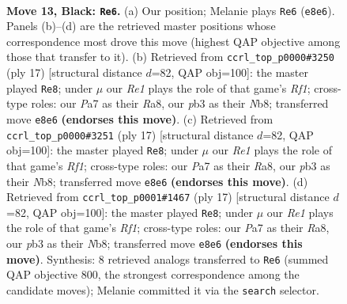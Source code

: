 \documentclass[11pt]{article}
\begin{document}
\clearpage

\begin{figure}[p]\centering
\begin{subfigure}{0.46\textwidth}\centering
\resizebox{\linewidth}{!}{%
\newchessgame
\chessboard[
  setfen={rnbqrk2/p4pp1/1p3n2/3p3p/Pb1P3P/1PNB1NP1/3K1P2/R1BQ3R b - - 0 13},
  showmover=false,
  pgfstyle=straightmove, color=movearrow, markmove={e8-e6}
]}
\caption{}
\end{subfigure}\hfill
\begin{subfigure}{0.46\textwidth}\centering
\resizebox{\linewidth}{!}{%
\newchessgame
\chessboard[
  setfen={rnbq1rk1/pp3pbp/3p1np1/2pP2B1/4P3/2N2N1P/PP3PP1/R2QKB1R b KQ - 0 9},
  showmover=false,
  pgfstyle=straightmove, color=movearrow, markmove={f8-e8}
]}
\caption{}
\end{subfigure}
\\[4pt]
\begin{subfigure}{0.46\textwidth}\centering
\resizebox{\linewidth}{!}{%
\newchessgame
\chessboard[
  setfen={rnbq1rk1/pp3pbp/3p1np1/2pP2B1/4P3/2N2N1P/PP3PP1/R2QKB1R b KQ - 0 9},
  showmover=false,
  pgfstyle=straightmove, color=movearrow, markmove={f8-e8}
]}
\caption{}
\end{subfigure}\hfill
\begin{subfigure}{0.46\textwidth}\centering
\resizebox{\linewidth}{!}{%
\newchessgame
\chessboard[
  setfen={rnbq1rk1/pp3pbp/3p1np1/2pP2B1/4P3/2N2N1P/PP3PP1/R2QKB1R b KQ - 0 9},
  showmover=false,
  pgfstyle=straightmove, color=movearrow, markmove={f8-e8}
]}
\caption{}
\end{subfigure}
\caption{\textbf{Move 13, Black: \texttt{Re6}.} (a) Our position; Melanie plays \texttt{Re6} (\texttt{e8e6}). Panels (b)--(d) are the retrieved master positions whose correspondence most drove this move (highest QAP objective among those that transfer to it). (b) Retrieved from \texttt{ccrl\_top\_p0000\#3250} (ply 17) [structural distance $d$=82, QAP obj=100]: the master played \texttt{Re8}; under $\mu$ our \emph{Re1} plays the role of that game's \emph{Rf1}; cross-type roles: our \emph{P}a7 as their \emph{R}a8, our \emph{p}b3 as their \emph{N}b8; transferred move \texttt{e8e6} \textbf{(endorses this move)}. (c) Retrieved from \texttt{ccrl\_top\_p0000\#3251} (ply 17) [structural distance $d$=82, QAP obj=100]: the master played \texttt{Re8}; under $\mu$ our \emph{Re1} plays the role of that game's \emph{Rf1}; cross-type roles: our \emph{P}a7 as their \emph{R}a8, our \emph{p}b3 as their \emph{N}b8; transferred move \texttt{e8e6} \textbf{(endorses this move)}. (d) Retrieved from \texttt{ccrl\_top\_p0001\#1467} (ply 17) [structural distance $d$=82, QAP obj=100]: the master played \texttt{Re8}; under $\mu$ our \emph{Re1} plays the role of that game's \emph{Rf1}; cross-type roles: our \emph{P}a7 as their \emph{R}a8, our \emph{p}b3 as their \emph{N}b8; transferred move \texttt{e8e6} \textbf{(endorses this move)}. Synthesis: 8 retrieved analogs transferred to \texttt{Re6} (summed QAP objective 800, the strongest correspondence among the candidate moves); Melanie committed it via the \texttt{search} selector.}
\label{fig:thought-m25}
\end{figure}
\end{document}

